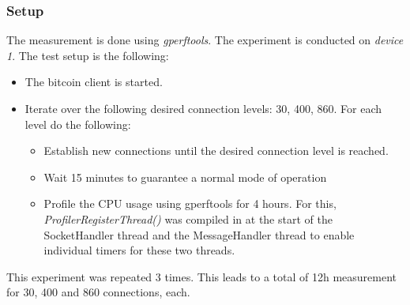 \subsubsection{Setup}
The measurement is done using \textit{gperftools}. The experiment is conducted on \textit{device 1}. The test setup is the following:
\begin{itemize}
	\item The bitcoin client is started.
	\item Iterate over the following desired connection levels: 30, 400, 860. For each level do the following:
	\begin{itemize}
	\item Establish new connections until the desired connection level is reached.
	\item Wait 15 minutes to guarantee a normal mode of operation
	\item Profile the CPU usage using gperftools for 4 hours. For this, \textit{ProfilerRegisterThread()} was compiled in at the start of the SocketHandler thread and the MessageHandler thread to enable individual timers for these two threads.
\end{itemize}
\end{itemize}
This experiment was repeated 3 times. This leads to a total of 12h measurement for 30, 400 and 860 connections, each.

